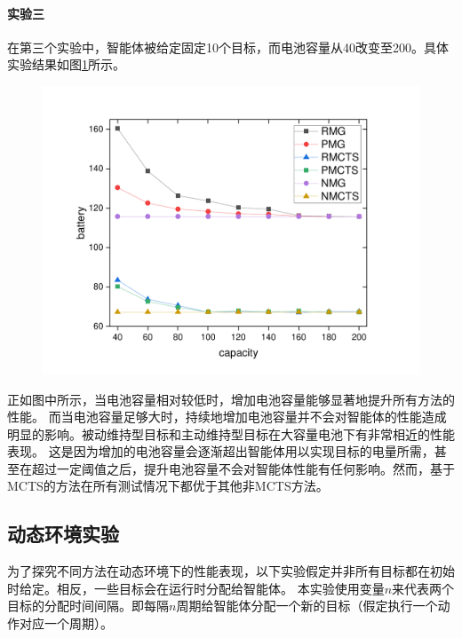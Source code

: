 \paragraph{实验三}
在第三个实验中，智能体被给定固定10个目标，而电池容量从40改变至200。具体实验结果如图\ref{fig:static4}所示。
\begin{figure}[h!]
\centering
\includegraphics[scale=0.4]{./figs/cX_cY_fixG10}
\captionsetup{justification=centering}
\label{fig:static4}
\end{figure}

正如图中所示，当电池容量相对较低时，增加电池容量能够显著地提升所有方法的性能。
%
而当电池容量足够大时，持续地增加电池容量并不会对智能体的性能造成明显的影响。被动维持型目标和主动维持型目标在大容量电池下有非常相近的性能表现。
%
这是因为增加的电池容量会逐渐超出智能体用以实现目标的电量所需，甚至在超过一定阈值之后，提升电池容量不会对智能体性能有任何影响。然而，基于MCTS的方法在所有测试情况下都优于其他非MCTS方法。

\subsection{动态环境实验}
为了探究不同方法在动态环境下的性能表现，以下实验假定并非所有目标都在初始时给定。相反，一些目标会在运行时分配给智能体。
%
本实验使用变量$n$来代表两个目标的分配时间间隔。即每隔$n$周期给智能体分配一个新的目标（假定执行一个动作对应一个周期）。

